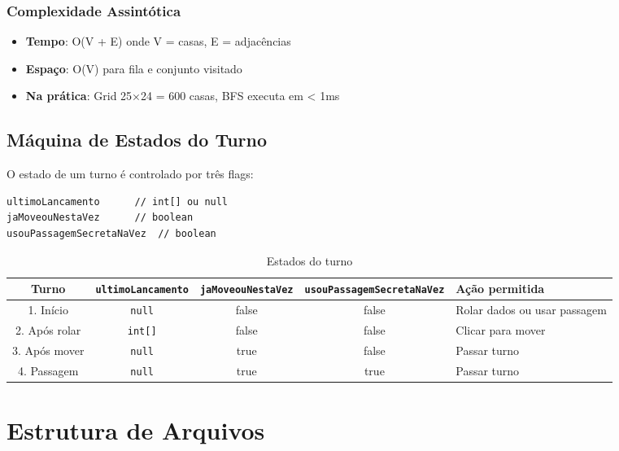 \documentclass[12pt,a4paper]{report}
\begin{document}
\subsection{Complexidade Assintótica}

\begin{itemize}
    \item \textbf{Tempo}: O(V + E) onde V = casas, E = adjacências
    \item \textbf{Espaço}: O(V) para fila e conjunto visitado
    \item \textbf{Na prática}: Grid 25×24 = 600 casas, BFS executa em < 1ms
\end{itemize}

\section{Máquina de Estados do Turno}

O estado de um turno é controlado por três flags:

\begin{lstlisting}
ultimoLancamento      // int[] ou null
jaMoveouNestaVez      // boolean
usouPassagemSecretaNaVez  // boolean
\end{lstlisting}

\begin{table}[H]
\centering
\begin{tabular}{|c|c|c|c|l|}
\hline
\textbf{Turno} & \texttt{ultimoLancamento} & \texttt{jaMoveouNestaVez} & \texttt{usouPassagemSecretaNaVez} & \textbf{Ação permitida} \\
\hline
1. Início & \texttt{null} & false & false & Rolar dados ou usar passagem \\
\hline
2. Após rolar & \texttt{int[]} & false & false & Clicar para mover \\
\hline
3. Após mover & \texttt{null} & true & false & Passar turno \\
\hline
4. Passagem & \texttt{null} & true & true & Passar turno \\
\hline
\end{tabular}
\caption{Estados do turno}
\end{table}

\chapter{Estrutura de Arquivos}
\end{document}
